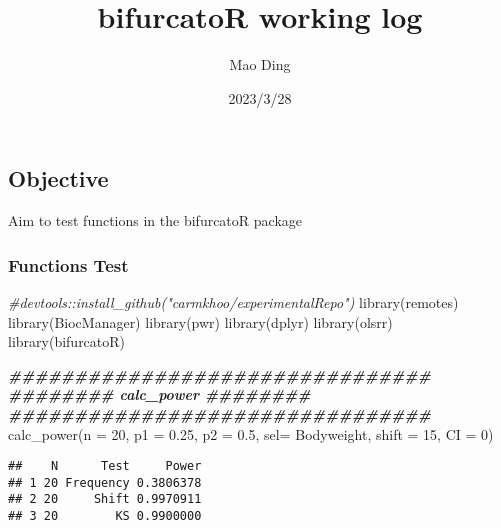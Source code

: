 \documentclass[
]{article}
\title{bifurcatoR working log}
\author{Mao Ding}
\date{2023/3/28}
\newenvironment{Shaded}{\begin{snugshade}}{\end{snugshade}}
\newcommand{\AttributeTok}[1]{\textcolor[rgb]{0.77,0.63,0.00}{#1}}
\newcommand{\CommentTok}[1]{\textcolor[rgb]{0.56,0.35,0.01}{\textit{#1}}}
\newcommand{\DecValTok}[1]{\textcolor[rgb]{0.00,0.00,0.81}{#1}}
\newcommand{\DocumentationTok}[1]{\textcolor[rgb]{0.56,0.35,0.01}{\textbf{\textit{#1}}}}
\newcommand{\FloatTok}[1]{\textcolor[rgb]{0.00,0.00,0.81}{#1}}
\newcommand{\FunctionTok}[1]{\textcolor[rgb]{0.00,0.00,0.00}{#1}}
\newcommand{\NormalTok}[1]{#1}
\newcommand{\StringTok}[1]{\textcolor[rgb]{0.31,0.60,0.02}{#1}}
\begin{document}
\maketitle

{
\setcounter{tocdepth}{2}
\tableofcontents
}
\hypertarget{objective}{%
\subsection{Objective}\label{objective}}

Aim to test functions in the bifurcatoR package

\hypertarget{functions-test}{%
\subsubsection{Functions Test}\label{functions-test}}

\begin{Shaded}
\begin{Highlighting}[]
\CommentTok{\#devtools::install\_github("carmkhoo/experimentalRepo")}
\FunctionTok{library}\NormalTok{(remotes)}
\FunctionTok{library}\NormalTok{(BiocManager)}
\FunctionTok{library}\NormalTok{(pwr)}
\FunctionTok{library}\NormalTok{(dplyr)}
\FunctionTok{library}\NormalTok{(olsrr)}
\FunctionTok{library}\NormalTok{(bifurcatoR)}
\end{Highlighting}
\end{Shaded}

\begin{Shaded}
\begin{Highlighting}[]
\DocumentationTok{\#\#\#\#\#\#\#\#\#\#\#\#\#\#\#\#\#\#\#\#\#\#\#\#\#\#\#\#\#\#\#\#}
\DocumentationTok{\#\#\#\#\#\#\#\# calc\_power \#\#\#\#\#\#\#\#}
\DocumentationTok{\#\#\#\#\#\#\#\#\#\#\#\#\#\#\#\#\#\#\#\#\#\#\#\#\#\#\#\#\#\#\#\#}
\FunctionTok{calc\_power}\NormalTok{(}\AttributeTok{n =} \DecValTok{20}\NormalTok{, }\AttributeTok{p1 =} \FloatTok{0.25}\NormalTok{, }\AttributeTok{p2 =} \FloatTok{0.5}\NormalTok{, }\AttributeTok{sel=} \StringTok{\textquotesingle{}Bodyweight\textquotesingle{}}\NormalTok{, }\AttributeTok{shift =} \DecValTok{15}\NormalTok{, }\AttributeTok{CI =} \DecValTok{0}\NormalTok{)}
\end{Highlighting}
\end{Shaded}

\begin{verbatim}
##    N      Test     Power
## 1 20 Frequency 0.3806378
## 2 20     Shift 0.9970911
## 3 20        KS 0.9900000
\end{verbatim}
\end{document}
